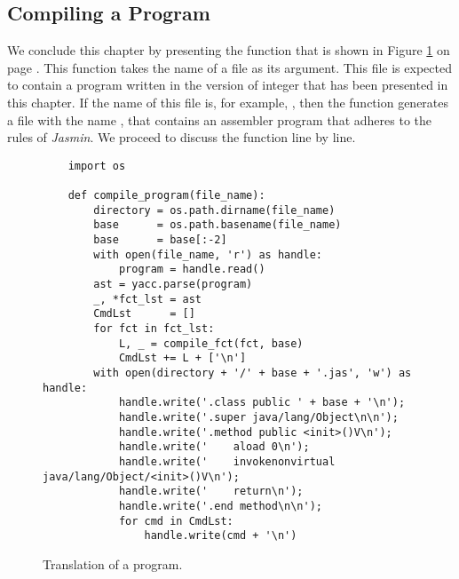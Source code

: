 \subsection{Compiling a Program}
We conclude this chapter by presenting the function  that is shown in Figure
\ref{fig:Compiler.ipynb:compile_program} on page \pageref{fig:Compiler.ipynb:compile_program}. This function
takes the name of a file as its argument.  This file is expected to contain a program written in the version of
integer  that has been presented in this chapter.  If the name of this file is, for example,
, then the function  generates a file with the name ,
that contains an assembler program that adheres to the rules of \textsl{Jasmin}. We proceed to discuss the
function  line by line. 

\begin{figure}[!ht]
\centering
\begin{verbatim}
    import os
                 
    def compile_program(file_name):
        directory = os.path.dirname(file_name)
        base      = os.path.basename(file_name)
        base      = base[:-2]
        with open(file_name, 'r') as handle:
            program = handle.read() 
        ast = yacc.parse(program)
        _, *fct_lst = ast
        CmdLst      = []
        for fct in fct_lst:
            L, _ = compile_fct(fct, base)
            CmdLst += L + ['\n']
        with open(directory + '/' + base + '.jas', 'w') as handle:
            handle.write('.class public ' + base + '\n');
            handle.write('.super java/lang/Object\n\n');
            handle.write('.method public <init>()V\n');
            handle.write('    aload 0\n');
            handle.write('    invokenonvirtual java/lang/Object/<init>()V\n');
            handle.write('    return\n');
            handle.write('.end method\n\n');
            for cmd in CmdLst:
                handle.write(cmd + '\n')                
\end{verbatim}
\vspace*{-0.3cm}
\caption{Translation of a program.}
\label{fig:Compiler.ipynb:compile_program}
\end{figure}

